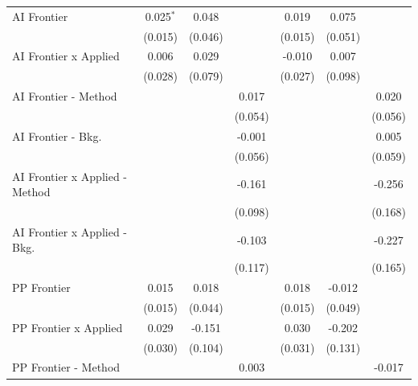 \begin{tabular}{lcccccc}
   AI Frontier                    & 0.025$^{*}$   & 0.048        &         & 0.019          & 0.075        &   \\   
                                  & (0.015)       & (0.046)      &         & (0.015)        & (0.051)      &   \\   
   AI Frontier x Applied          & 0.006         & 0.029        &         & -0.010         & 0.007        &   \\   
                                  & (0.028)       & (0.079)      &         & (0.027)        & (0.098)      &   \\   
   AI Frontier - Method           &               &              & 0.017   &                &              & 0.020\\   
                                  &               &              & (0.054) &                &              & (0.056)\\   
   AI Frontier - Bkg.             &               &              & -0.001  &                &              & 0.005\\   
                                  &               &              & (0.056) &                &              & (0.059)\\   
   AI Frontier x Applied - Method &               &              & -0.161  &                &              & -0.256\\   
                                  &               &              & (0.098) &                &              & (0.168)\\   
   AI Frontier x Applied - Bkg.   &               &              & -0.103  &                &              & -0.227\\   
                                  &               &              & (0.117) &                &              & (0.165)\\   
   PP Frontier                    & 0.015         & 0.018        &         & 0.018          & -0.012       &   \\   
                                  & (0.015)       & (0.044)      &         & (0.015)        & (0.049)      &   \\   
   PP Frontier x Applied          & 0.029         & -0.151       &         & 0.030          & -0.202       &   \\   
                                  & (0.030)       & (0.104)      &         & (0.031)        & (0.131)      &   \\   
   PP Frontier - Method           &               &              & 0.003   &                &              & -0.017\\   

\end{tabular}
